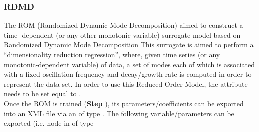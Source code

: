 \subsubsection{RDMD}
  The  ROM (Randomized Dynamic Mode Decomposition) aimed to construct a time-
  dependent (or any other monotonic     variable) surrogate model based on Randomized Dynamic Mode
  Decomposition     This surrogate is aimed to perform a ``dimensionality reduction regression'',
  where, given time     series (or any monotonic-dependent variable) of data, a set of modes each of
  which is associated     with a fixed oscillation frequency and decay/growth rate is computed
  in order to represent the data-set.     In order to use this Reduced Order Model, the
   attribute      needs to be set equal to .     \\
  Once the ROM  is trained (\textbf{Step} ), its parameters/coefficients can be
  exported into an XML file     via an  of type . The following
  variable/parameters  can be exported (i.e.  node     in  of type
